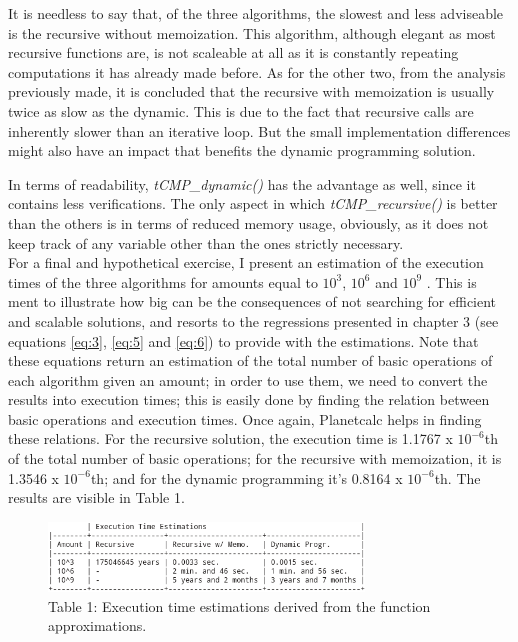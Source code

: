 \documentclass[shortpaper]{revdetua}
\begin{document}
It is needless to say that, of the three algorithms, the slowest and less 
adviseable is the recursive without memoization.
This algorithm, although elegant as most recursive functions are, is not 
scaleable at all as it is constantly repeating computations it has already made
before.
As for the other two, from the analysis previously made, it is concluded that 
the recursive with memoization is usually twice as slow as the dynamic.
This is due to the fact that recursive calls are inherently slower than an 
iterative loop.
But the small implementation differences might also have an impact that benefits
the dynamic programming solution.

In terms of readability, {\it tCMP\_dynamic()\/} has the advantage as well, 
since it contains less verifications.
The only aspect in which {\it tCMP\_recursive()\/} is better than the others is
in terms of reduced memory usage, obviously, as it does not keep track of any 
variable other than the ones strictly necessary. \\

For a final and hypothetical exercise, I present an estimation of the execution
times of the three algorithms for amounts equal to $10^{3}$, $10^{6}$ and $10^{9}$ .
This is ment to illustrate how big can be the consequences of not searching for
efficient and scalable solutions, and resorts to the regressions presented in 
chapter 3 (see equations \ref{eq:3}, \ref{eq:5} and \ref{eq:6}) to provide with
the estimations.
Note that these equations return an estimation of the total number of basic 
operations of each algorithm given an amount; in order to use them, we need to
convert the results into execution times; this is easily done by finding the 
relation between basic operations and execution times.
Once again, Planetcalc helps in finding these relations.
For the recursive solution, the execution time is 1.1767 x $10^{-6}$th of the 
total number of basic operations; for the recursive with memoization, it is
1.3546 x $10^{-6}$th; and for the dynamic programming it's 0.8164 x $10^{-6}$th.
The results are visible in Table 1.

\begin{figure}[H]
    \centering
    \setlength{\belowcaptionskip}{-10pt}
    \includegraphics[width=3.3in]{../results/results_estimations.png}
    \caption{Table 1: Execution time estimations derived from the function approximations.}
    \label{tab:1}
\end{figure}
\end{document}
